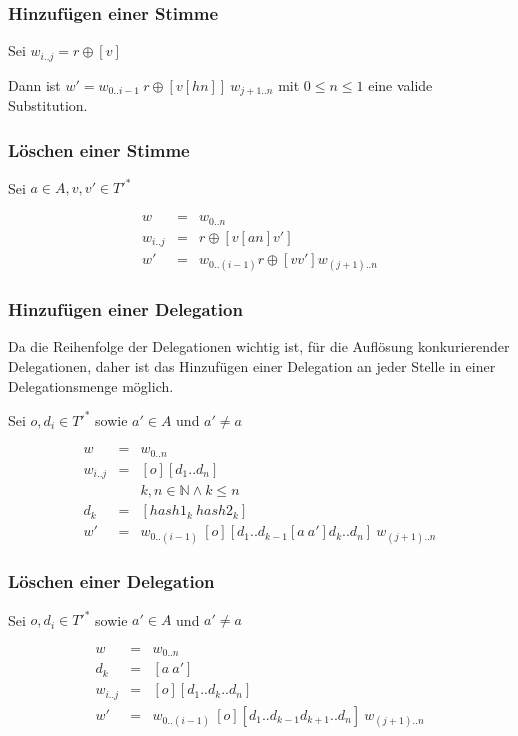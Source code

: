 \documentclass[]{article}
\begin{document}
\subsubsection*{Hinzufügen einer Stimme}

Sei $w_{i..j} = r\oplus [v]$

Dann ist $w' = w_{0 .. i-1}\ r \oplus [v[h n]]\ w_{j+1 .. n}$ mit $0\leq n\leq 1$ eine valide Substitution.

\subsubsection*{Löschen einer Stimme}

Sei $a\in A, v,v'\in T'^*$

\begin{eqnarray}
  w &=& w_{0..n} \\
  w_{i..j}&=& r\oplus [v [an] v'] \\
  w' &=& w_{0..(i-1)} r\oplus [vv'] w_{(j+1)..n}
\end{eqnarray}


\subsubsection*{Hinzufügen einer Delegation}
Da die Reihenfolge der Delegationen wichtig ist, für die Auflösung konkurierender Delegationen, daher ist das Hinzufügen einer Delegation an jeder Stelle in einer Delegationsmenge möglich.

Sei $o,d_i \in T'^*$ sowie $a'\in A$ und $a'\neq a$

\begin{eqnarray}
  w &=& w_{0..n} \\
  w_{i..j} &=& [o][d_1 .. d_n] \\
  &&k,n\in \mathbb{N} \land k\leq n \\
  d_k &=& [hash1_k\ hash2_k] \\ 
  w' &=& w_{0 .. (i-1)}\ [o][d_1 .. d_{k-1} [a\ a'] d_k .. d_n ]\ w_{(j+1) .. n}
\end{eqnarray}

\subsubsection*{Löschen einer Delegation}

Sei $o,d_i \in T'^*$ sowie $a'\in A$ und $a'\neq a$

\begin{eqnarray}
  w &=& w_{0..n} \\
  d_k &=& [a\ a'] \\
  w_{i..j} &=& [o][d_1 .. d_{k} .. d_n ] \\
  w' &=& w_{0 .. (i-1)}\ [o][d_1 .. d_{k-1} d_{k+1} .. d_n ]\ w_{(j+1) .. n}
\end{eqnarray}
\end{document}
